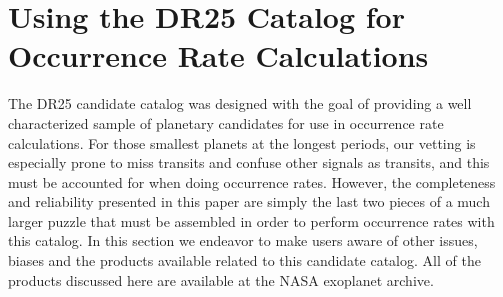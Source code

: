\section{Using the DR25 Catalog for Occurrence Rate Calculations}
\label{s:occurates}
The DR25 candidate catalog was designed with the goal of providing a well characterized sample of planetary candidates for use in occurrence rate calculations.  For those smallest planets at the longest periods, our vetting is especially prone to miss transits and confuse other signals as transits, and this must be accounted for when doing occurrence rates.  However, the completeness and reliability presented in this paper are simply the last two pieces of a much larger puzzle that must be assembled in order to perform occurrence rates with this catalog.  In this section we endeavor to make users aware of other issues, biases and the products available related to this candidate catalog.  All of the products discussed here are available at the NASA exoplanet archive. 


